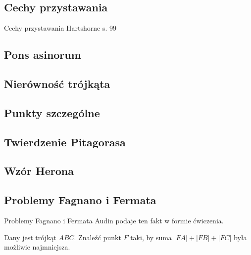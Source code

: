 

\subsection{Cechy przystawania}
Cechy przystawania
\loremipsum
Hartshorne s. 99

\subsection{Pons asinorum}


\subsection{Nierówność trójkąta}


\subsection{Punkty szczególne}


\subsection{Twierdzenie Pitagorasa}


\subsection{Wzór Herona}


\subsection{Problemy Fagnano i Fermata}
Problemy Fagnano i Fermata %
Audin \cite[s. 101]{audin_2003} podaje ten fakt w formie ćwiczenia.

\begin{problem}
	Dany jest trójkąt $ABC$.
	Znaleźć punkt $F$ taki, by suma $|FA| + |FB| + |FC|$ była możliwie najmniejsza.
%
\end{problem}

